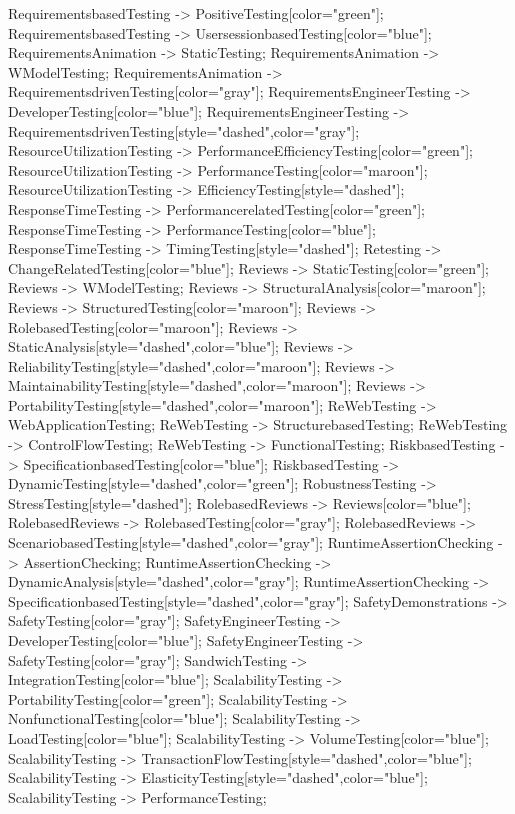 \documentclass{article}
\begin{document}
{RequirementsbasedTesting -> PositiveTesting[color="green"];
RequirementsbasedTesting -> UsersessionbasedTesting[color="blue"];
RequirementsAnimation -> StaticTesting;
RequirementsAnimation -> WModelTesting;
RequirementsAnimation -> RequirementsdrivenTesting[color="gray"];
RequirementsEngineerTesting -> DeveloperTesting[color="blue"];
RequirementsEngineerTesting -> RequirementsdrivenTesting[style="dashed",color="gray"];
ResourceUtilizationTesting -> PerformanceEfficiencyTesting[color="green"];
ResourceUtilizationTesting -> PerformanceTesting[color="maroon"];
ResourceUtilizationTesting -> EfficiencyTesting[style="dashed"];
ResponseTimeTesting -> PerformancerelatedTesting[color="green"];
ResponseTimeTesting -> PerformanceTesting[color="blue"];
ResponseTimeTesting -> TimingTesting[style="dashed"];
Retesting -> ChangeRelatedTesting[color="blue"];
Reviews -> StaticTesting[color="green"];
Reviews -> WModelTesting;
Reviews -> StructuralAnalysis[color="maroon"];
Reviews -> StructuredTesting[color="maroon"];
Reviews -> RolebasedTesting[color="maroon"];
Reviews -> StaticAnalysis[style="dashed",color="blue"];
Reviews -> ReliabilityTesting[style="dashed",color="maroon"];
Reviews -> MaintainabilityTesting[style="dashed",color="maroon"];
Reviews -> PortabilityTesting[style="dashed",color="maroon"];
ReWebTesting -> WebApplicationTesting;
ReWebTesting -> StructurebasedTesting;
ReWebTesting -> ControlFlowTesting;
ReWebTesting -> FunctionalTesting;
RiskbasedTesting -> SpecificationbasedTesting[color="blue"];
RiskbasedTesting -> DynamicTesting[style="dashed",color="green"];
RobustnessTesting -> StressTesting[style="dashed"];
RolebasedReviews -> Reviews[color="blue"];
RolebasedReviews -> RolebasedTesting[color="gray"];
RolebasedReviews -> ScenariobasedTesting[style="dashed",color="gray"];
RuntimeAssertionChecking -> AssertionChecking;
RuntimeAssertionChecking -> DynamicAnalysis[style="dashed",color="gray"];
RuntimeAssertionChecking -> SpecificationbasedTesting[style="dashed",color="gray"];
SafetyDemonstrations -> SafetyTesting[color="gray"];
SafetyEngineerTesting -> DeveloperTesting[color="blue"];
SafetyEngineerTesting -> SafetyTesting[color="gray"];
SandwichTesting -> IntegrationTesting[color="blue"];
ScalabilityTesting -> PortabilityTesting[color="green"];
ScalabilityTesting -> NonfunctionalTesting[color="blue"];
ScalabilityTesting -> LoadTesting[color="blue"];
ScalabilityTesting -> VolumeTesting[color="blue"];
ScalabilityTesting -> TransactionFlowTesting[style="dashed",color="blue"];
ScalabilityTesting -> ElasticityTesting[style="dashed",color="blue"];
ScalabilityTesting -> PerformanceTesting;
}
\end{document}
